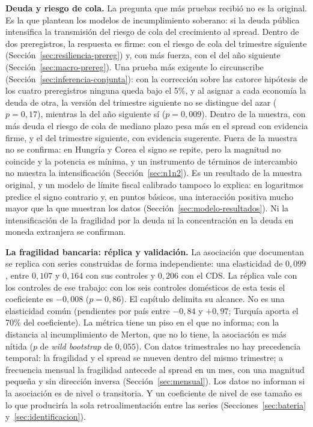 \textbf{Deuda y riesgo de cola.} La pregunta que más pruebas recibió no es la original. Es la que plantean los modelos de incumplimiento soberano: si la deuda pública intensifica la transmisión del riesgo de cola del crecimiento al spread. Dentro de dos preregistros, la respuesta es firme: con el riesgo de cola del trimestre siguiente (Sección~\ref{sec:resiliencia-prereg}) y, con más fuerza, con el del año siguiente (Sección~\ref{sec:macro-prereg}). Una prueba más exigente lo circunscribe (Sección~\ref{sec:inferencia-conjunta}): con la corrección sobre las catorce hipótesis de los cuatro preregistros ninguna queda bajo el 5\%, y al asignar a cada economía la deuda de otra, la versión del trimestre siguiente no se distingue del azar ($p=0{,}17$), mientras la del año siguiente sí ($p=0{,}009$). Dentro de la muestra, con más deuda el riesgo de cola de mediano plazo pesa más en el spread con evidencia firme, y el del trimestre siguiente, con evidencia sugerente. Fuera de la muestra no se confirma: en Hungría y Corea el signo se repite, pero la magnitud no coincide y la potencia es mínima, y un instrumento de términos de intercambio no muestra la intensificación (Sección~\ref{sec:n1n2}). Es un resultado de la muestra original, y un modelo de límite fiscal calibrado tampoco lo explica: en logaritmos predice el signo contrario y, en puntos básicos, una interacción positiva mucho mayor que la que muestran los datos (Sección~\ref{sec:modelo-resultados}). Ni la intensificación de la fragilidad por la deuda ni la concentración en la deuda en moneda extranjera se confirman.

\textbf{La fragilidad bancaria: réplica y validación.} La asociación que documentan \citet{Chari2024b} se replica con series construidas de forma independiente: una elasticidad de $0{,}099$, entre $0{,}107$ y $0{,}164$ con sus controles y $0{,}206$ con el CDS. La réplica vale con los controles de ese trabajo: con los seis controles domésticos de esta tesis el coeficiente es $-0{,}008$ ($p=0{,}86$). El capítulo delimita su alcance. No es una elasticidad común (pendientes por país entre $-0{,}84$ y $+0{,}97$; Turquía aporta el 70\% del coeficiente). La métrica tiene un piso en el que no informa; con la distancia al incumplimiento de Merton, que no lo tiene, la asociación es más nítida ($p$ de \textit{wild bootstrap} de $0{,}055$). Con datos trimestrales no hay precedencia temporal: la fragilidad y el spread se mueven dentro del mismo trimestre; a frecuencia mensual la fragilidad antecede al spread en un mes, con una magnitud pequeña y sin dirección inversa (Sección~\ref{sec:mensual}). Los datos no informan si la asociación es de nivel o transitoria. Y un coeficiente de nivel de ese tamaño es lo que produciría la sola retroalimentación entre las series (Secciones~\ref{sec:bateria} y~\ref{sec:identificacion}).

